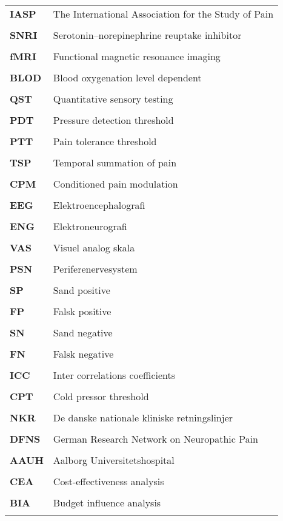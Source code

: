 \begin{longtable}{p{}  p{}}
\textbf{IASP} & The International Association for the Study of Pain  
\\ \\
\textbf{SNRI} & Serotonin–norepinephrine reuptake inhibitor
\\ \\
\textbf{fMRI}  & Functional magnetic resonance imaging     
\\ \\
\textbf{BLOD}  & Blood oxygenation level dependent     
\\ \\
\textbf{QST} & Quantitative sensory testing
\\ \\
\textbf{PDT} & Pressure detection threshold
\\ \\
\textbf{PTT}  & Pain tolerance threshold
\\ \\
\textbf{TSP}  & Temporal summation of pain 
\\ \\
\textbf{CPM}  & Conditioned pain modulation
\\ \\
\textbf{EEG}  & Elektroencephalograﬁ 
\\ \\
\textbf{ENG} & Elektroneurograﬁ
\\ \\
\textbf{VAS} & Visuel analog skala
\\ \\
\textbf{PSN} & Periferenervesystem
\\ \\
\textbf{SP} & Sand positive
\\ \\
\textbf{FP} & Falsk positive
\\ \\
\textbf{SN} & Sand negative
\\ \\
\textbf{FN} & Falsk negative
\\ \\
\textbf{ICC} & Inter correlations coefficients  
\\ \\
\textbf{CPT} & Cold pressor threshold
\\ \\
\textbf{NKR}  & De danske nationale kliniske retningslinjer    
\\ \\
\textbf{DFNS}  & German Research Network on Neuropathic Pain     
\\ \\
\textbf{AAUH} & Aalborg Universitetshospital
\\ \\
\textbf{CEA} & Cost-eﬀectiveness analysis
\\ \\
\textbf{BIA}  & Budget influence analysis
\\ \\
\end{longtable}
